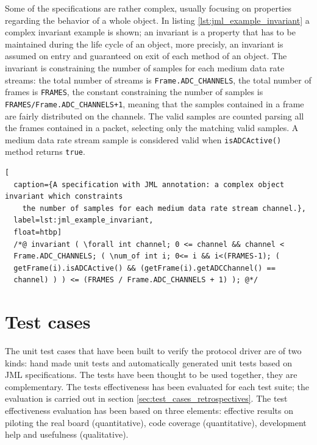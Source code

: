\documentclass{article} \usepackage{times}
\newcommand{\lil}[1]{\texttt{\lstinline|#1|}}
\begin{document}
\sloppy

Some of the specifications are rather complex, usually focusing on
properties regarding the behavior of a whole object.  In listing
\ref{lst:jml_example_invariant} a complex invariant example is shown;
an invariant is a property that has to be maintained during the life
cycle of an object, more precisly, an invariant is assumed on entry
and guaranteed on exit of each method of an object.  The invariant is
constraining the number of samples for each medium data rate streams:
the total number of streams is \lil{Frame.ADC_CHANNELS}, the total
number of frames is \lil{FRAMES}, the constant constraining the number
of samples is \lil{FRAMES/Frame.ADC_CHANNELS+1}, meaning that the
samples contained in a frame are fairly distributed on the channels.
The valid samples are counted parsing all the frames contained in a
packet, selecting only the matching valid samples.  A medium data rate
stream sample is considered valid when \lil{isADCActive()} method
returns \lil{true}.

\fussy

\begin{lstlisting}[
  caption={A specification with JML annotation: a complex object invariant which constraints 
    the number of samples for each medium data rate stream channel.},
  label=lst:jml_example_invariant,
  float=htbp]
  /*@ invariant ( \forall int channel; 0 <= channel && channel <
  Frame.ADC_CHANNELS; ( \num_of int i; 0<= i && i<(FRAMES-1); (
  getFrame(i).isADCActive() && (getFrame(i).getADCChannel() ==
  channel) ) ) <= (FRAMES / Frame.ADC_CHANNELS + 1) ); @*/
\end{lstlisting}



\section{Test cases}
\label{sec:test_cases}

The unit test cases that have been built to verify the protocol driver
are of two kinds: hand made unit tests and automatically generated
unit tests based on JML specifications.  The tests have been thought
to be used together, they are complementary.  The tests effectiveness
has been evaluated for each test suite; the evaluation is carried out
in section \ref{sec:test_cases_retrospectives}.  The test
effectiveness evaluation has been based on three elements: effective
results on piloting the real board (quantitative), code coverage
(quantitative), development help and usefulness (qualitative).
\end{document}
